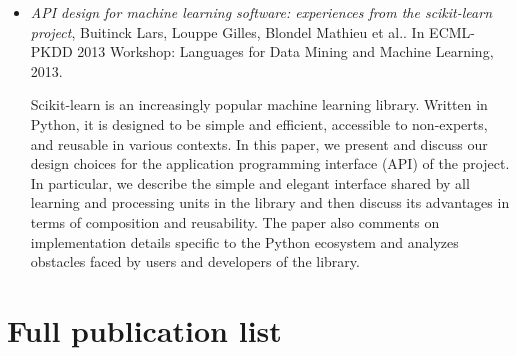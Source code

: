 \begin{itemize}
\item \citep{buitinck:2013} \textit{API design for machine learning software: experiences from the scikit-learn project},
Buitinck Lars, Louppe Gilles, Blondel Mathieu et al..
In ECML-PKDD 2013 Workshop: Languages for Data Mining and Machine Learning, 2013.

Scikit-learn is an increasingly popular machine learning library. Written in Python, it is designed to be simple and efficient, accessible to non-experts, and reusable in various contexts. In this paper, we present and discuss our design choices for the application programming interface (API) of the project. In particular, we describe the simple and elegant interface shared by all learning and processing units in the library and then discuss its advantages in terms of composition and reusability. The paper also comments on implementation details specific to the Python ecosystem and analyzes obstacles faced by users and developers of the library.


\end{itemize}

\section{Full publication list}

